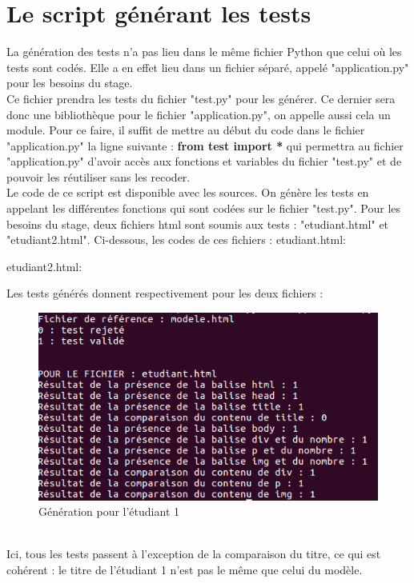 \documentclass[12pt,twoside]{book}
\begin{document}
\section{Le script générant les tests}
La génération des tests n'a pas lieu dans le même fichier Python que celui où les tests sont codés. Elle a en effet lieu dans un fichier séparé, appelé "application.py" pour les besoins du stage. \\
Ce fichier prendra les tests du fichier "test.py" pour les générer. Ce dernier sera donc une bibliothèque pour le fichier "application.py", on appelle aussi cela un module. Pour ce faire, il suffit de mettre au début du code dans le fichier "application.py" la ligne suivante : \textbf{from test import *} qui permettra au fichier "application.py" d'avoir accès aux fonctions et variables du fichier "test.py" et de pouvoir les réutiliser sans les recoder.\\
Le code de ce script est disponible avec les sources. On génère les tests en appelant les différentes fonctions qui sont codées sur le fichier "test.py". Pour les besoins du stage, deux fichiers html sont soumis aux tests : "etudiant.html" et "etudiant2.html". Ci-dessous, les codes de ces fichiers :
\newpage
etudiant.html:

etudiant2.html:

\newpage
Les tests générés donnent respectivement pour les deux fichiers :
\begin{figure}[h]
\begin{center}
\includegraphics[width=120mm]{generationetudiant1.png}
\caption{Génération pour l'étudiant 1}
\label{fig:génération pour l'étudiant 1}
\end{center}
\end{figure}
\\Ici, tous les tests passent à l'exception de la comparaison du titre, ce qui est cohérent : le titre de l'étudiant 1 n'est pas le même que celui du modèle.
\end{document}
